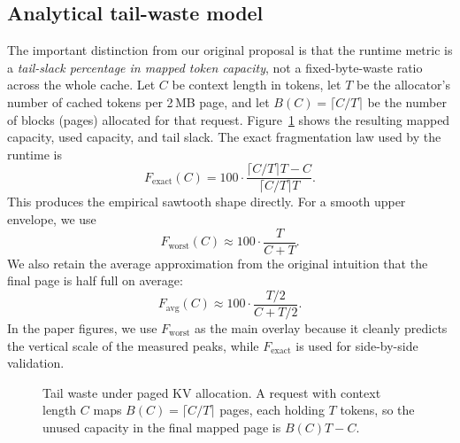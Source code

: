 \documentclass[conference]{IEEEtran}
\begin{document}
\subsection{Analytical tail-waste model}
The important distinction from our original proposal is that 
the runtime metric is a \emph{tail-slack percentage in mapped token capacity}, 
not a fixed-byte-waste ratio across the whole cache. Let $C$ be 
context length in tokens, let $T$ be the allocator's number of cached 
tokens per 2\,MB page, and let $B(C)=\lceil C/T\rceil$ be the number of
blocks (pages) allocated for that request. Figure~\ref{fig:fragmentation-intuition}
shows the resulting mapped capacity, used capacity, and tail slack. The exact
fragmentation law used by the runtime is
\begin{equation}
F_{\text{exact}}(C)=100\cdot\frac{\lceil C/T \rceil T - C}{\lceil C/T \rceil T}.
\end{equation}
This produces the empirical sawtooth shape directly. For a smooth upper 
envelope, we use
\begin{equation}
F_{\text{worst}}(C)\approx 100\cdot\frac{T}{C+T}.
\end{equation}
We also retain the average approximation from the original intuition 
that the final page is half full on average:
\begin{equation}
F_{\text{avg}}(C)\approx 100\cdot\frac{T/2}{C+T/2}.
\end{equation}
In the paper figures, we use $F_{\text{worst}}$ as the main 
overlay because it cleanly predicts the vertical scale of the 
measured peaks, while $F_{\text{exact}}$ is used for side-by-side validation.

\begin{figure}[t]
\centering
{}
\caption{Tail waste under paged KV allocation. A request with context length $C$
maps $B(C)=\lceil C/T\rceil$ pages, each holding $T$ tokens, so the unused
capacity in the final mapped page is $B(C)T-C$.}
\label{fig:fragmentation-intuition}
\end{figure}
\end{document}
